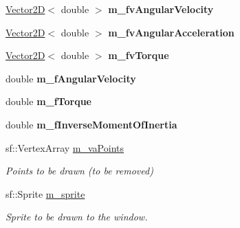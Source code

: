 \begin{DoxyCompactItemize}
\item 
\hypertarget{class_collidable_a9913b4fa9f36e30a83940ac333da4b99}{}\hyperlink{class_vector2_d}{Vector2\+D}$<$ double $>$ {\bfseries m\+\_\+fv\+Angular\+Velocity}\label{class_collidable_a9913b4fa9f36e30a83940ac333da4b99}

\item 
\hypertarget{class_collidable_ad0a8edff679d8f048023dc5f7f560b0b}{}\hyperlink{class_vector2_d}{Vector2\+D}$<$ double $>$ {\bfseries m\+\_\+fv\+Angular\+Acceleration}\label{class_collidable_ad0a8edff679d8f048023dc5f7f560b0b}

\item 
\hypertarget{class_collidable_a8c45a631264b9ae9d57617deefe3bf92}{}\hyperlink{class_vector2_d}{Vector2\+D}$<$ double $>$ {\bfseries m\+\_\+fv\+Torque}\label{class_collidable_a8c45a631264b9ae9d57617deefe3bf92}

\item 
\hypertarget{class_collidable_a5a6501f0c062b6c24f3121c5c68b59d4}{}double {\bfseries m\+\_\+f\+Angular\+Velocity}\label{class_collidable_a5a6501f0c062b6c24f3121c5c68b59d4}

\item 
\hypertarget{class_collidable_a84f79454b1dac54f7b9042660d89e8ca}{}double {\bfseries m\+\_\+f\+Torque}\label{class_collidable_a84f79454b1dac54f7b9042660d89e8ca}

\item 
\hypertarget{class_collidable_aef9f604795e30d09737aee26beb128ae}{}double {\bfseries m\+\_\+f\+Inverse\+Moment\+Of\+Inertia}\label{class_collidable_aef9f604795e30d09737aee26beb128ae}

\item 
\hypertarget{class_collidable_a13a62d6d9fb69397c5ad03e6ec1c3b2d}{}sf\+::\+Vertex\+Array \hyperlink{class_collidable_a13a62d6d9fb69397c5ad03e6ec1c3b2d}{m\+\_\+va\+Points}\label{class_collidable_a13a62d6d9fb69397c5ad03e6ec1c3b2d}

\begin{DoxyCompactList}\small\item\em Points to be drawn (to be removed) \end{DoxyCompactList}\item 
\hypertarget{class_collidable_a5392bcb0ef0fef2e60b68a447e4d0ae7}{}sf\+::\+Sprite \hyperlink{class_collidable_a5392bcb0ef0fef2e60b68a447e4d0ae7}{m\+\_\+sprite}\label{class_collidable_a5392bcb0ef0fef2e60b68a447e4d0ae7}

\begin{DoxyCompactList}\small\item\em Sprite to be drawn to the window. \end{DoxyCompactList}\end{DoxyCompactItemize}


